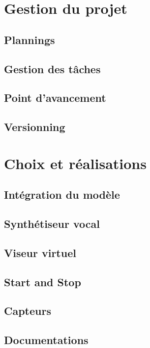 \documentclass[UTF8]{EPURapport}
\begin{document}
\chapter{Gestion du projet}

\section{Plannings}

\section{Gestion des tâches}

\section{Point d'avancement}

\section{Versionning}

\chapter{Choix et réalisations}

\section{Intégration du modèle}

\section{Synthétiseur vocal}

\section{Viseur virtuel}

\section{Start and Stop}

\section{Capteurs}

\section{Documentations}
\end{document}
